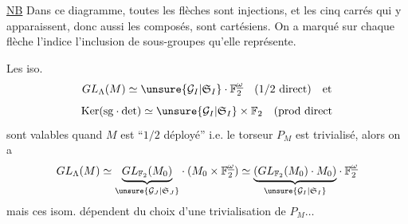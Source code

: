 \uline{NB} Dans ce diagramme, toutes les flèches sont injections, et les cinq carrés qui y apparaissent, donc aussi les composés, sont cartésiens. On a marqué sur chaque flèche l'indice  l'inclusion de sous-groupes qu'elle représente.

Les iso.
\[
GL_\Lambda(M)\simeq\unsure{\mathcal{G}_I|\mathfrak S_I}\cdot\mathbb{F}_2^{\underline\omega}\quad(1/2\text{ direct})\quad\text{et}
\]
\[
\mathrm{Ker}(\mathrm{sg}\cdot\det)\simeq\unsure{\mathcal{G}_I|\mathfrak S_I}\times\mathbb{F}_2\quad(\text{prod direct}
\]
sont valables quand $M$ est ``$1/2$ déployé'' i.e. le torseur $P_M$ est trivialisé, alors on a
\[
GL_\Lambda(M)\simeq
\underset{\unsure{\mathcal{G}_J|\mathfrak S_J}}{\underbrace{GL_{\mathbb{F}_2}(M_0)}}\cdot(M_0\times\mathbb{F}_2^{\underline\omega})
\simeq
\underset{\unsure{\mathcal{G}_I|\mathfrak S_I}}{\underbrace{(GL_{\mathbb{F}_2}(M_0)\cdot M_0)}}\cdot\mathbb{F}_2^{\underline\omega}
\]
mais ces isom. dépendent du choix d'une trivialisation de $P_M\ldots$
